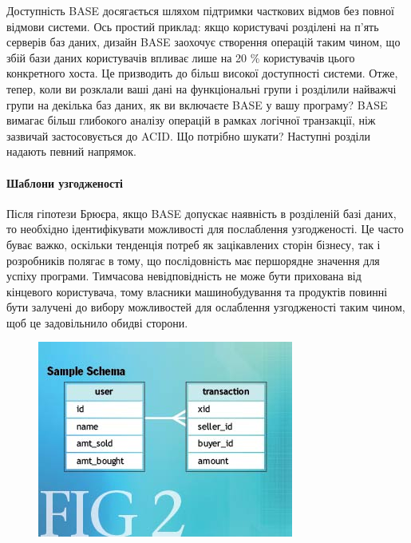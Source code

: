 \documentclass[14pt]{vakthesis}
\begin{document}
Доступність BASE досягається шляхом підтримки часткових відмов без повної відмови системи. Ось простий приклад: якщо користувачі розділені на п'ять серверів баз даних, дизайн BASE заохочує створення операцій таким чином, що збій бази даних користувачів впливає лише на 20 \% користувачів цього конкретного хоста. Це призводить до більш високої доступності системи.
Отже, тепер, коли ви розклали ваші дані на функціональні групи і розділили найважчі групи на декілька баз даних, як ви включаєте BASE у вашу програму? BASE вимагає більш глибокого аналізу операцій в рамках логічної транзакції, ніж зазвичай застосовується до ACID. Що потрібно шукати? Наступні розділи надають певний напрямок.

\paragraph{Шаблони узгодженості}

Після гіпотези Брюєра, якщо BASE допускає наявність в розділеній базі даних, то необхідно ідентифікувати можливості для послаблення узгодженості. Це часто буває важко, оскільки тенденція потреб як зацікавлених сторін бізнесу, так і розробників полягає в тому, що послідовність має першорядне значення для успіху програми. Тимчасова невідповідність не може бути прихована від кінцевого користувача, тому власники машинобудування та продуктів повинні бути залучені до вибору можливостей для ослаблення узгодженості таким чином, щоб це задовільнило обидві сторони.

\begin{figure}
\centering
\includegraphics[width=\linewidth]{images/sample_schema.jpg}
     \label{fig:sample_schema}
\end{figure}
\end{document}

